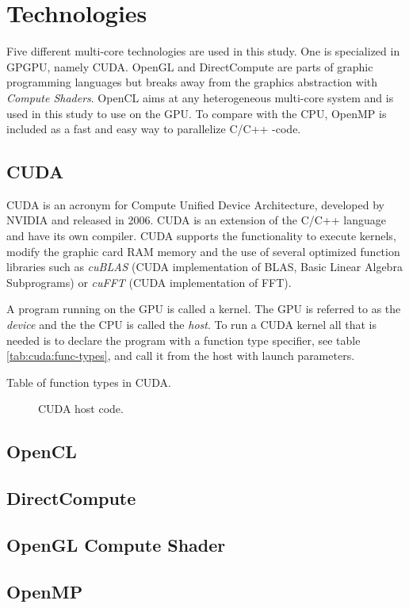 \chapter{Technologies}

Five different multi-core technologies are used in this study. One is specialized in GPGPU, namely CUDA. OpenGL and DirectCompute are parts of graphic programming languages but breaks away from the graphics abstraction with \textit{Compute Shaders}. OpenCL aims at any heterogeneous multi-core system and is used in this study to use on the GPU. To compare with the CPU, OpenMP is included as a fast and easy way to parallelize C/C++ -code.

\section{CUDA}

CUDA is an acronym for Compute Unified Device Architecture, developed by NVIDIA and released in 2006. CUDA is an extension of the C/C++ language and have its own compiler. CUDA supports the functionality to execute kernels, modify the graphic card RAM memory and the use of several optimized function libraries such as \textit{cuBLAS} (CUDA implementation of BLAS, Basic Linear Algebra Subprograms) or \textit{cuFFT} (CUDA implementation of FFT).

A program running on the GPU is called a kernel. The GPU is referred to as the \textit{device} and the the CPU is called the \textit{host}. To run a CUDA kernel all that is needed is to declare the program with a function type specifier, see table \ref{tab:cuda:func-types}, and call it from the host with launch parameters.

\begin{table}
	\centering
	
	\caption{Table of function types in CUDA.}
	\label{tab:cuda:func-types}
\end{table}

\begin{figure}
	\centering
	\begin{framed}
			
	\end{framed}
	\caption{CUDA host code.}
	\label{lst:cuda:host-example}	
\end{figure}

\section{OpenCL}

\section{DirectCompute}

\section{OpenGL Compute Shader}

\section{OpenMP}